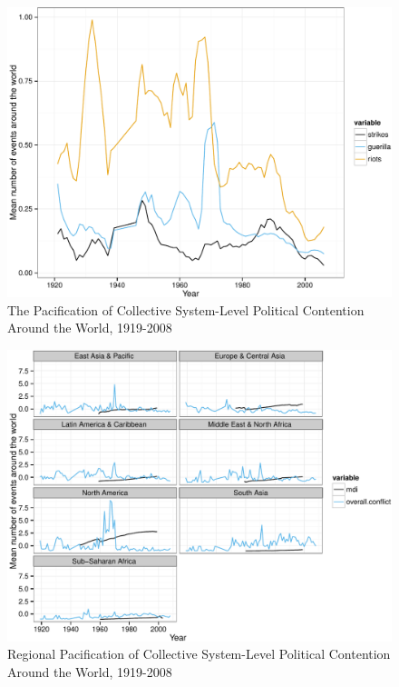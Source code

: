 \documentclass[12pt,book]{article}
\begin{document}
\begin{figure}[htbp]
\centering
\includegraphics{pacification_of_the_world_files/figure-latex/global-pacification.pdf}
\caption{The Pacification of Collective System-Level Political
Contention Around the World, 1919-2008}
\end{figure}

\begin{figure}[htbp]
\centering
\includegraphics{pacification_of_the_world_files/figure-latex/regional-pacification.pdf}
\caption{Regional Pacification of Collective System-Level Political
Contention Around the World, 1919-2008}
\end{figure}
\end{document}
